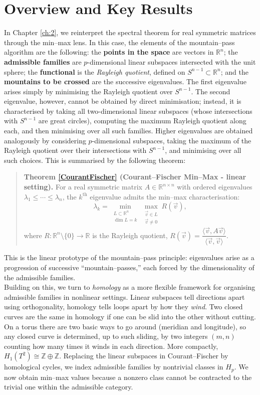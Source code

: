  
\section{Overview and Key Results}
In Chapter \ref{ch:2}, we reinterpret the spectral theorem for real symmetric matrices through the min--max lens. In this case, the elements of the mountain--pass algorithm are the following: the \textbf{points in the space} are vectors in $\mathbb{R}^n$; the \textbf{admissible families} are $p$-dimensional linear subspaces intersected with the unit sphere; the \textbf{functional} is the \emph{Rayleigh quotient}, defined on $S^{n-1}\subset\mathbb{R}^n$; and the \textbf{mountains to be crossed} are the successive eigenvalues. The first eigenvalue arises simply by minimising the Rayleigh quotient over $S^{n-1}$. The second eigenvalue, however, cannot be obtained by direct minimisation; instead, it is characterised by taking all two-dimensional linear subspaces (whose intersections with $S^{n-1}$ are great circles), computing the maximum Rayleigh quotient along each, and then minimising over all such families. Higher eigenvalues are obtained analogously by considering $p$-dimensional subspaces, taking the maximum of the Rayleigh quotient over their intersections with $S^{n-1}$, and minimising over all such choices. This is summarised by the following theorem:
\begin{quote}
\textbf{Theorem \ref{CourantFischer} (Courant--Fischer Min--Max - linear setting).}  For a real symmetric matrix $A \in \mathbb{R}^{n \times n}$ with ordered eigenvalues $\lambda_1 \leq \cdots \leq \lambda_n$, the $k^{\text{th}}$ eigenvalue admits the min--max characterisation: $$\lambda_k=\min_{\substack{L\subset \mathbb{R}^n\\ \dim L = k}} \max_{\substack{\vec{v}\in L\\ \vec{v}\neq 0}} R(\vec{v}),$$
where $R:\mathbb{R}^n\setminus\{0\}\to \mathbb{R}$ is the Rayleigh quotient, $R(\vec v)=\dfrac{\langle \vec {v}, A\vec{v}\rangle}{\langle\vec v,\vec v\rangle}$.
\end{quote}
This is the linear prototype of the mountain--pass principle: eigenvalues arise as a progression of successive “mountain--passes,”  each forced by the dimensionality of the admissible families.\\
Building on this, we turn to \emph{homology} as a more flexible framework for organising admissible families in nonlinear settings. Linear subspaces tell directions apart using orthogonality, homology tells loops apart by how they \emph{wind}. Two closed curves are the same in homology if one can be slid into the other without cutting. On a torus there are two basic ways to go around (meridian and longitude), so any closed curve is determined, up to such sliding, by two integers \((m,n)\) counting how many times it winds in each direction. More compactly, \(H_1(T^2)\cong \mathbb{Z}\oplus\mathbb{Z}\). Replacing the linear subspaces in Courant--Fischer by homological cycles, we index admissible families by nontrivial classes in $H_p$. We now obtain min--max values because a nonzero class cannot be contracted to the trivial one within the admissible category.

